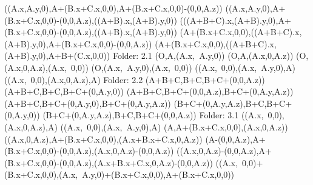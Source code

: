 \left(\left(A.x,A.y,0\right),A+\left(B.x+C.x,0,0\right),A+\left(B.x+C.x,0,0\right)-\left(0,0,A.z\right)\right)
\left(\left(A.x,A.y,0\right),A+\left(B.x+C.x,0,0\right)-\left(0,0,A.z\right),\left(\left(A+B\right).x,\left(A+B\right).y,0\right)\right)
\left(\left(\left(A+B+C\right).x,\left(A+B\right).y,0\right),A+\left(B.x+C.x,0,0\right)-\left(0,0,A.z\right),\left(\left(A+B\right).x,\left(A+B\right).y,0\right)\right)
\left(A+\left(B.x+C.x,0,0\right),\left(\left(A+B+C\right).x,\left(A+B\right).y,0\right),A+\left(B.x+C.x,0,0\right)-\left(0,0,A.z\right)\right)
\left(A+\left(B.x+C.x,0,0\right),\left(\left(A+B+C\right).x,\left(A+B\right).y,0\right),A+B+\left(C.x,0,0\right)\right)
Folder: 2.1
\left(O,A,\left(A.x,\ A.y,0\right)\right)
\left(O,A,\left(A.x,0,A.z\right)\right)
\left(O,\left(A.x,0,A.z\right),\left(A.x,\ 0,0\right)\right)
\left(O,\left(A.x,\ A.y,0\right),\left(A.x,\ 0,0\right)\right)
\left(\left(A.x,\ 0,0\right),\left(A.x,\ A.y,0\right),A\right)
\left(\left(A.x,\ 0,0\right),\left(A.x,0,A.z\right),A\right)
Folder: 2.2
\left(A+B+C,B+C,B+C+\left(0,0,A.z\right)\right)
\left(A+B+C,B+C,B+C+\left(0,A.y,0\right)\right)
\left(A+B+C,B+C+\left(0,0,A.z\right),B+C+\left(0,A.y,A.z\right)\right)
\left(A+B+C,B+C+\left(0,A.y,0\right),B+C+\left(0,A.y,A.z\right)\right)
\left(B+C+\left(0,A.y,A.z\right),B+C,B+C+\left(0,A.y,0\right)\right)
\left(B+C+\left(0,A.y,A.z\right),B+C,B+C+\left(0,0,A.z\right)\right)
Folder: 3.1
\left(\left(A.x,\ 0,0\right),\left(A.x,0,A.z\right),A\right)
\left(\left(A.x,\ 0,0\right),\left(A.x,\ A.y,0\right),A\right)
\left(A,A+\left(B.x+C.x,0,0\right),\left(A.x,0,A.z\right)\right)
\left(\left(A.x,0,A.z\right),A+\left(B.x+C.x,0,0\right),\left(A.x+B.x+C.x,0,A.z\right)\right)
\left(A-\left(0,0,A.z\right),A+\left(B.x+C.x,0,0\right)-\left(0,0,A.z\right),\left(A.x,0,A.z\right)-\left(0,0,A.z\right)\right)
\left(\left(A.x,0,A.z\right)-\left(0,0,A.z\right),A+\left(B.x+C.x,0,0\right)-\left(0,0,A.z\right),\left(A.x+B.x+C.x,0,A.z\right)-\left(0,0,A.z\right)\right)
\left(\left(A.x,\ 0,0\right)+\left(B.x+C.x,0,0\right),\left(A.x,\ A.y,0\right)+\left(B.x+C.x,0,0\right),A+\left(B.x+C.x,0,0\right)\right)
